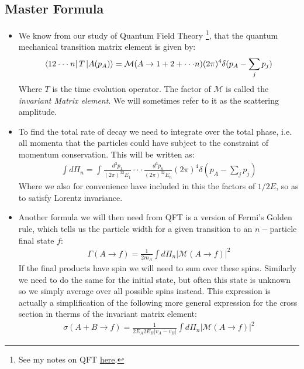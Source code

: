 \documentclass[11pt]{article}
\numberwithin{equation}{section}
\begin{document}
 \subsection{Master Formula} %
 \label{sub:master_formula}
 \begin{itemize}
     \item We know from our study of Quantum Field Theory \footnote{See my notes on QFT \href{https://tbrosnan12.github.io/documents/Fourth_year/First_semester/Quantum_Field_Theory_I.pdf}{here}.}, that the quantum mechanical transition matrix element is given by:
     \begin{align}
     \label{T_hat}
         \bra{12 \cdot \cdot \cdot n}T \ket{A(p_A)} = \mathcal{M}(A \rightarrow 1 +2 + \cdot \cdot \cdot n)(2\pi)^4\delta(p_A - \sum_jp_j)
     \end{align}
     Where $T$ is the time evolution operator. The factor of $\mathcal{M}$ is called the \emph{invariant Matrix element}. We will sometimes refer to it as the scattering amplitude. 
     \item To find the total rate of decay we need to integrate over the total phase, i.e. all momenta that the particles could have subject to the constraint of momentum conservation. This will be written as:
     \begin{align*}
          \int d\Pi_n = \int \frac{d^3p_1}{(2\pi)^32E_1} \cdot \cdot \cdot \frac{d^3p_n}{(2\pi)^32E_n}(2\pi)^4\delta(p_A - \sum_jp_j)
      \end{align*} 
Where we also for convenience have included in this the factors of $1/2E$, so as to satisfy Lorentz invariance.
\item Another formula we will then need from QFT is a version of Fermi's Golden rule, which tells us the particle width for a given transition to an $n-$particle final state $f$:
\begin{align*}
    \Gamma(A \rightarrow f) = \frac{1}{2m_A}\int d\Pi_n|\mathcal{M}(A\rightarrow f)|^2
\end{align*}
If the final products have spin we will need to sum over these spins. Similarly we need to do the same for the initial state, but often this state is unknown so we simply average over all possible spins instead. This expression is actually a simplification of the following more general expression for the cross section in therms of the invariant matrix element:
\begin{align}
\label{cross}
    \sigma(A+B \rightarrow f) = \frac{1}{2E_A2E_B|v_A-v_B|}\int d\Pi_n|\mathcal{M}(A\rightarrow f)|^2
\end{align}

 \end{itemize}
\end{document}

